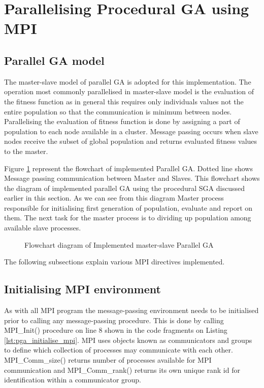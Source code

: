 \section{Parallelising Procedural GA using MPI}
\subsection{Parallel GA model}
The master-slave model of parallel GA is adopted for this implementation. The operation most commonly parallelised in master-slave model is the evaluation of the fitness function as in general this requires only individuals values not the entire population so that the communication is minimum between nodes. Parallelising the evaluation of fitness function is done by assigning a part of population to each node available in a cluster. Message passing occurs when slave nodes receive the subset of global population and returns evaluated fitness values to the master. 

Figure \ref{fig:flowchart_pga} represent the flowchart of implemented Parallel GA. Dotted line shows Message passing communication between Master and Slaves. This flowchart shows the diagram of implemented parallel GA using the procedural SGA discussed earlier in this section. As we can see from this diagram Master process responsible for initialising first generation of population, evaluate and report on them. The next task for the master process is to dividing up population among available slave processes. 

\begin{figure}[!hp]
    \vspace*{-1cm}
    \caption{Flowchart diagram of Implemented master-slave Parallel GA}
     \label{fig:flowchart_pga}
\end{figure}


The following subsections explain various MPI directives implemented.

\subsection{Initialising MPI environment}
As with all MPI program the message-passing environment needs to be initialised prior to calling any message-passing procedure. This is done by calling MPI\_Init() procedure on line 8 shown in the code fragments on Listing \ref{lst:pga_initialise_mpi}. MPI uses objects known as communicators and groups to define which collection of processes may communicate with each other. MPI\_Comm\_size() returns number of processes available for MPI communication and MPI\_Comm\_rank() returns its own unique rank id for identification within a communicator group.

